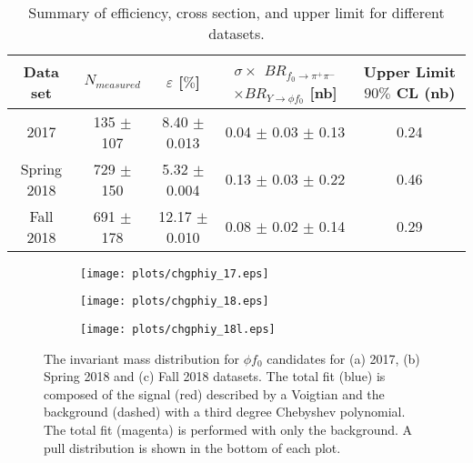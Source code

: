 \begin{center}
    \begin{table}[htbp]
        \centering
        \caption{Summary of efficiency, cross section, and upper limit for different datasets.}
        \label{tab.xsec_ul.yphifo}
        \begin{tabular}{|c|c|c|c|c|}
            \hline
            Data set & $N_{measured}$ & $\varepsilon$ [$\%$] & \thead{$\sigma \times$ \\ $BR_{f_{0}\rightarrow\pi^{+}\pi^{-}}$ $\times BR_{Y\rightarrow \phi f_0}$ [nb]} & \thead{Upper Limit\\$90\%$ CL (nb)}\\
            \hline
            2017 & 135 $\pm$ 107 & 8.40 $\pm$ 0.013 & 0.04 $\pm$ 0.03 $\pm$ 0.13 & 0.24 \\
            Spring 2018 & 729 $\pm$ 150 & 5.32 $\pm$ 0.004 & 0.13 $\pm$ 0.03 $\pm$ 0.22 & 0.46 \\
            Fall 2018 & 691 $\pm$ 178 & 12.17 $\pm$ 0.010 & 0.08 $\pm$ 0.02 $\pm$ 0.14 & 0.29 \\
            \hline
        \end{tabular}
    \end{table}
\end{center}

\begin{figure}[htbp]
    \centering
    \begin{subfigure}[b]{0.49\textwidth}
        \texttt{[image: plots/chgphiy\_17.eps]}
        \caption{}
        \label{fig.xsec_ul.yphifo.1.a}
    \end{subfigure}
    \begin{subfigure}[b]{0.49\textwidth}
        \texttt{[image: plots/chgphiy\_18.eps]}
        \caption{}
        \label{fig.xsec_ul.yphifo.1.b}
    \end{subfigure}
    \begin{subfigure}[b]{0.49\textwidth}
        \texttt{[image: plots/chgphiy\_18l.eps]}
        \caption{}
        \label{fig.xsec_ul.yphifo.1.c}
    \end{subfigure}
    \caption{The invariant mass distribution for $\phi f_0$ candidates for (a) 2017, (b) Spring 2018 and (c) Fall 2018 datasets. The total fit (blue) is composed of the signal (red) described by a Voigtian and the background (dashed) with a third degree Chebyshev polynomial. The total fit (magenta) is performed with only the background. A pull distribution is shown in the bottom of each plot.}
    \label{fig.xsec_ul.yphifo.1}
\end{figure}

